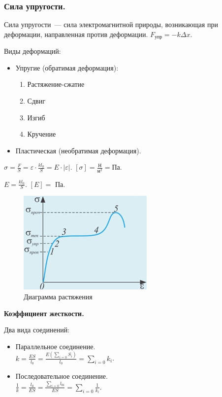 \documentclass{article}
\begin{document}
	\subsubsection{Сила упругости.}
	\begin{definition}
		Сила упругости~--- сила электромагнитной природы, возникающая при деформации, направленная против деформации. $F_{\text{упр}} = -k \varDelta x$.
	\end{definition}
	\begin{definition}
		Виды деформаций:
		\begin{itemize}
			\item Упругие (обратимая деформация):
			\begin{enumerate}
				\item Растяжение-сжатие
				\item Сдвиг
				\item Изгиб
				\item Кручение
			\end{enumerate}
			\item Пластическая (необратимая деформация).
		\end{itemize}
	\end{definition}
	\begin{definition}
		$\sigma = \frac{F}{S} = \varepsilon \cdot \frac{kl_0}{S} = E \cdot |\varepsilon|$. $[\sigma] = \frac{\text{Н}}{\text{м}^2} = \text{Па}$.
	\end{definition}
	\begin{definition}
		$E = \frac{kl_0}{S}$. $[E] =$ Па.
	\end{definition}
	\begin{figure}[H]
		\includegraphics[height=0.35\textwidth]{extra-materials/Диаграмма-растяжения}
		\caption{Диаграмма растяжения}
	\end{figure}
	\textbf{Коэффициент жесткости.}
	\begin{definition}
		Два вида соединений:
		\begin{itemize}
			\item Параллельное соединение. \\
			$k = \frac{ES}{l_0} = \frac{E(\sum_{i = 0} S_i)}{l_0} = \sum_{i = 0} k_i$.
			\item Последовательное соединение. \\
			$\frac{1}{k} = \frac{l_0}{ES} = \frac{\sum_{i = 0} l_{0i}}{ES} = \sum_{i = 0} \frac{1}{k_i}$.
		\end{itemize}
	\end{definition}
\end{document}
